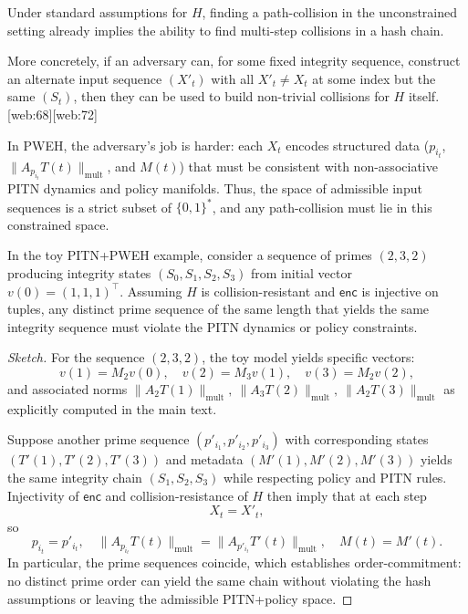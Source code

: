 \documentclass[11pt]{article}
\begin{document}
Under standard assumptions for \(H\), finding a path-collision in the unconstrained setting already implies the ability to find multi-step collisions in a hash chain.

More concretely, if an adversary can, for some fixed integrity sequence, construct an alternate input sequence \((X'_t)\) with all \(X'_t \neq X_t\) at some index but the same \((S_t)\), then they can be used to build non-trivial collisions for \(H\) itself. [web:68][web:72]

In PWEH, the adversary's job is harder:
each \(X_t\) encodes structured data (\(p_{i_t}\), \(\|A_{p_{i_t}}T(t)\|_{\mathrm{mult}}\), and \(M(t)\)) that must be consistent with non-associative PITN dynamics and policy manifolds.
Thus, the space of admissible input sequences is a strict subset of \(\{0,1\}^*\), and any path-collision must lie in this constrained space.

\begin{lemma}
In the toy PITN+PWEH example, consider a sequence of primes \((2,3,2)\) producing integrity states \((S_0,S_1,S_2,S_3)\) from initial vector \(v(0)=(1,1,1)^\top\).
Assuming \(H\) is collision-resistant and \(\mathsf{enc}\) is injective on tuples, any distinct prime sequence of the same length that yields the same integrity sequence must violate the PITN dynamics or policy constraints.
\end{lemma}

\begin{proof}[Sketch]
For the sequence \((2,3,2)\), the toy model yields specific vectors:
\[
  v(1) = M_2 v(0), \quad v(2) = M_3 v(1), \quad v(3) = M_2 v(2),
\]
and associated norms \(\|A_{2}T(1)\|_{\mathrm{mult}},\ \|A_{3}T(2)\|_{\mathrm{mult}},\ \|A_2 T(3)\|_{\mathrm{mult}}\) as explicitly computed in the main text.

Suppose another prime sequence \((p'_{i_1},p'_{i_2},p'_{i_3})\) with corresponding states \((T'(1),T'(2),T'(3))\) and metadata \((M'(1),M'(2),M'(3))\) yields the same integrity chain \((S_1,S_2,S_3)\) while respecting policy and PITN rules.
Injectivity of \(\mathsf{enc}\) and collision-resistance of \(H\) then imply that at each step
\[
  X_t = X'_t,
\]
so
\[
  p_{i_t} = p'_{i_t},\quad \|A_{p_{i_t}}T(t)\|_{\mathrm{mult}} = \|A_{p'_{i_t}}T'(t)\|_{\mathrm{mult}},\quad M(t) = M'(t).
\]
In particular, the prime sequences coincide, which establishes order-commitment: no distinct prime order can yield the same chain without violating the hash assumptions or leaving the admissible PITN+policy space.
\end{proof}
\end{document}
